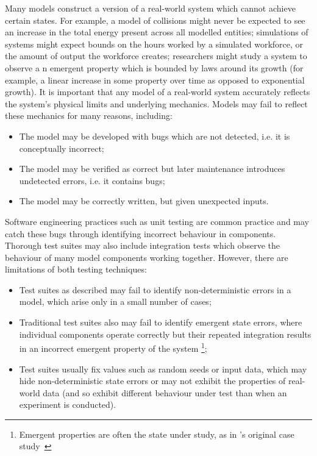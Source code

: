 Many models construct a version of a real-world system which cannot achieve
certain states. For example, a model of collisions might never be expected to
see an increase in the total energy present across all modelled entities;
simulations of \sociotechnical systems might expect bounds on the hours worked
by a simulated workforce, or the amount of output the workforce creates;
researchers might study a system to observe a n emergent property which is
bounded by laws around its growth (for example, a linear increase in some
property over time as opposed to exponential growth). It is important that any
model of a real-world system accurately reflects the system's physical limits
and underlying mechanics. Models may fail to reflect these mechanics for many
reasons, including:

\begin{itemize}
    \item The model may be developed with bugs which are not detected, i.e. it is
    conceptually incorrect;
    \item The model may be verified as correct but later maintenance introduces
    undetected errors, i.e. it contains bugs;
    \item The model may be correctly written, but given unexpected inputs.
\end{itemize}

Software engineering practices such as unit testing are common practice and may
catch these bugs through identifying incorrect behaviour in components.
Thorough test suites may also include integration tests which observe the
behaviour of many model components working together. However, there are
limitations of both testing techniques:

\begin{itemize}
    \item Test suites as described may fail to identify non-deterministic errors
    in a model, which arise only in a small number of cases;
    \item Traditional test suites also may fail to identify emergent state
    errors, where individual components operate correctly but their repeated
    integration results in an incorrect emergent property of the system
    \footnote{Emergent properties are often the state under study, as in \pdsf's original
    case study~\cite{wallis2018caise}};
    \item Test suites usually fix values such as random seeds or input data,
    which may hide non-deterministic state errors or may not exhibit the
    properties of real-world data (and so exhibit different behaviour under test
    than when an experiment is conducted).
\end{itemize}

